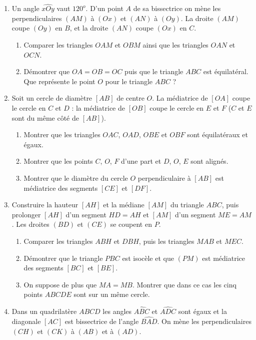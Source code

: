 \documentclass[12 pt]{report}
\theoremstyle{plain}
\newcounter{n}
\begin{document}
\begin{enumerate}
\begin{enumerate}
\end{enumerate}
\item Un angle $\widehat{xOy}$ vaut $120^o$. D'un point $A$ de sa bissectrice on mène les perpendiculaires $(AM)$ à $(Ox)$ et $(AN)$ à $(Oy)$. La droite $(AM)$ coupe $(Oy)$ en $B$, et la droite $(AN)$ coupe $(Ox)$ en $C$. \begin{enumerate}
\item Comparer les triangles $OAM$ et $OBM$ ainsi que les triangles $OAN$ et $OCN$.
\item Démontrer que $OA=OB=OC$ puis que le triangle $ABC$ est équilatéral. \\ 
Que représente le point $O$ pour le triangle $ABC$ ?
\end{enumerate}
\item Soit un cercle de diamètre $[AB]$ de centre $O$. La médiatrice de $[OA]$ coupe
le cercle en $C$ et $D$ : la médiatrice de $[OB]$ coupe le cercle en $E$ et $F$ ($C$ et $E$ sont du même côté de $[AB]$). \begin{enumerate}
\item Montrer que les triangles $OAC$, $OAD$, $OBE$ et $OBF$ sont équilatéraux et égaux.
\item Montrer que les points $C$, $O$, $F$ d'une part et $D$, $O$, $E$ sont alignés.
\item Montrer que le diamètre du cercle $O$ perpendiculaire à $[AB]$ est médiatrice
des segments $[CE]$ et $[DF]$. 
\end{enumerate}
\item Construire la hauteur $[AH]$ et la médiane $[AM]$ du triangle $ABC$, puis
prolonger $[AH]$ d'un segment $HD=AH$ et $[AM]$ d'un segment $ME=AM$. Les droites $(BD)$ et $(CE)$ se coupent en $P$. \begin{enumerate}
\item Comparer les triangles $ABH$ et $DBH$, puis les triangles $MAB$ et $MEC$. 
\item Démontrer que le triangle $PBC$ est isocèle et que $(PM)$ est médiatrice des segments $[BC]$ et $[BE]$. 
\item On suppose de plus que $MA=MB$. Montrer que dans ce cas les cinq points $ABCDE$ sont sur un même cercle.
\end{enumerate}
\item Dans un quadrilatère $ABCD$ les angles $\widehat{ABC}$ et $\widehat{ADC}$ sont égaux et la diagonale $[AC]$ est bissectrice de l'angle $\widehat{BAD}$. On mène 
les perpendiculaires $(CH)$ et $(CK)$ à $(AB)$ et à $(AD)$. \begin{enumerate}

\end{enumerate}
\end{enumerate}
\end{document}
